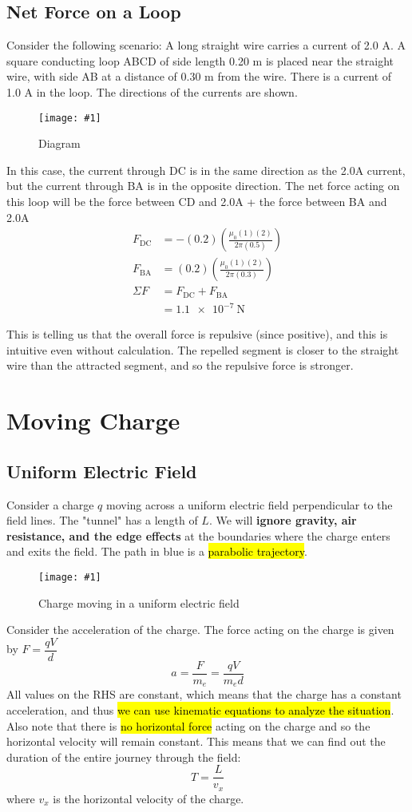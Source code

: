 \documentclass[a4paper,12pt]{article}
\let\oldsection\section
\renewcommand\section{\clearpage\oldsection}
\newcommand{\lb}{\\[8pt]}
\newcommand{\img}[4]{\begin{center}
  \begin{figure}[H]
    \centering
    \texttt{[image: \#1]}
    \caption{#3}
    \label{fig:#4}
  \end{figure}
\end{center}}
\begin{document}
\subsection{Net Force on a Loop}

Consider the following scenario: A  long straight wire carries a current of 2.0 A. A square conducting loop ABCD of side length 0.20 m is placed near the straight wire, with side AB at a distance of 0.30 m from
the wire. There is a current of 1.0 A in the loop. The directions of the currents are shown.

\img{ex/1.png}{0.4}{Diagram}{ex1}

In this case, the current through DC is in the same direction as the 2.0A current, but the current through BA is in the opposite direction. The net force acting on this loop will be the force between CD and 2.0A + the force between BA and 2.0A
\begin{align*}
  F_\text{DC} & = -(0.2)(\frac{\mu_0(1)(2)}{2\pi(0.5)}) \\
  F_\text{BA} & = (0.2)(\frac{\mu_0(1)(2)}{2\pi(0.3)})  \\
  \Sigma F    & = F_\text{DC} + F_\text{BA}             \\
              & = \SI{1.1e-7}{\N}
\end{align*}

This is telling us that the overall force is repulsive (since positive), and this is intuitive even without calculation. The repelled segment is closer to the straight wire than the attracted segment, and so the repulsive force is stronger.


\section{Moving Charge}

\subsection{Uniform Electric Field}

Consider a charge $q$ moving across a uniform electric field perpendicular to the field lines. The "tunnel" has a length of $L$. We will \textbf{ignore gravity, air resistance, and the edge effects} at the boundaries where the charge enters and exits the field. The path in blue is a \hl{parabolic trajectory}.
\img{move1.png}{0.7}{Charge moving in a uniform electric field}{move1}

Consider the acceleration of the charge. The force acting on the charge is given by $F = \dfrac{qV}{d}$
$$a = \frac{F}{m_e} = \frac{qV}{m_ed}$$
All values on the RHS are constant, which means that the charge has a constant acceleration, and thus \hl{we can use kinematic equations to analyze the situation}.\lb
Also note that there is \hl{no horizontal force} acting on the charge and so the horizontal velocity will remain constant. This means that we can find out the duration of the entire journey through the field:
$$T = \frac{L}{v_x}$$
where $v_x$ is the horizontal velocity of the charge.
\end{document}
